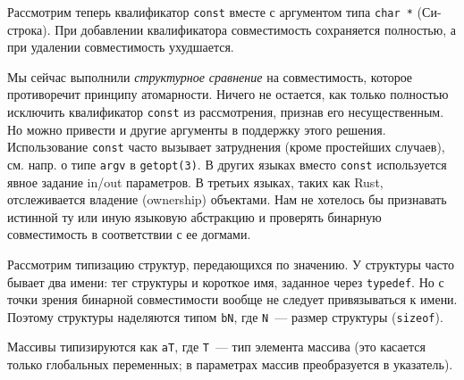 \documentclass[russian,a4paper,12pt]{article}
\begin{document}
Рассмотрим теперь квалификатор \verb|const| вместе с аргументом типа \verb|char *| (Си-строка).
При добавлении квалификатора совместимость сохраняется полностью, а при удалении совместимость
ухудшается.
\begin{comment}
А может мы вообще должны были писать в эту строку, т.е. она была out-параметром?
С какой радости тогда "совместимость сохраняется"?  Мы думали нам запишут в строку,
а ее вместо этого берут как \verb|const|, смотрят что там в ней есть интересного.
\end{comment}
Мы сейчас выполнили \textit{структурное сравнение} на совместимость, которое противоречит
принципу атомарности.  Ничего не остается, как только полностью исключить квалификатор \verb|const|
из рассмотрения, признав его несущественным.  Но можно привести и другие аргументы в поддержку
этого решения.
Использование \verb|const| часто вызывает затруднения (кроме простейших случаев),
см. напр. о типе \verb|argv| в \verb|getopt(3)|.
В других языках вместо \verb|const| используется явное задание in/out параметров.
В третьих языках, таких как Rust, отслеживается владение (ownership) объектами.
Нам не хотелось бы признавать истинной ту или иную языковую абстракцию и проверять
бинарную совместимость в соответствии с ее догмами.
\begin{comment}
Тем более что в языке Си строковые литералы имеют типа char[].
Но модифицировать этот char строго запрещается, хотя он и не const.
Хреновые догмы какие-то, хуже Халкидонских канонов.
\end{comment}

Рассмотрим типизацию структур, передающихся по значению.  У структуры часто бывает
два имени: тег структуры и короткое имя, заданное через \verb|typedef|.  Но с точки
зрения бинарной совместимости вообще не следует привязываться к имени.  Поэтому
структуры наделяются типом \verb|bN|, где \verb|N|~--- размер структуры (\verb|sizeof|).

Массивы типизируются как \verb|aT|, где \verb|T|~--- тип элемента массива (это касается
только глобальных переменных; в параметрах массив преобразуется в указатель).
\end{document}
